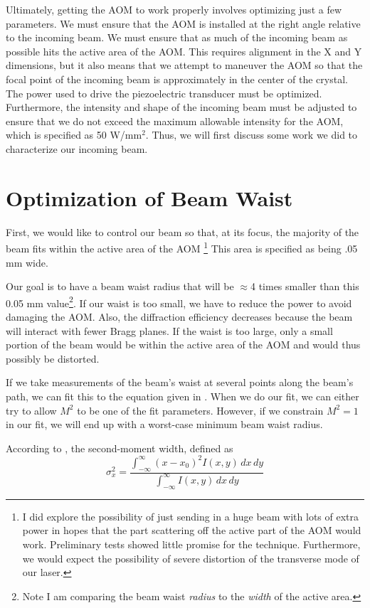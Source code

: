 Ultimately, getting the AOM to work properly involves optimizing just a few parameters. We must ensure that the AOM is installed at the right angle relative to the incoming beam. We must ensure that as much of the incoming beam as possible hits the active area of the AOM. This requires alignment in the X and Y dimensions, but it also means that we attempt to maneuver the AOM so that the focal point of the incoming beam is approximately in the center of the crystal. The power used to drive the piezoelectric transducer must be optimized. Furthermore, the intensity and shape of the incoming beam must be adjusted to ensure that we do not exceed the maximum allowable intensity for the AOM, which is specified as 50 W/mm$^2$.
Thus, we will first discuss some work we did to characterize our incoming beam.

\section{Optimization of Beam Waist}
First, we would like to control our beam so that, at its focus, the majority of the beam fits within the active area of the AOM \footnote{I did explore the possibility of just sending in a huge beam with lots of extra power in hopes that the part scattering off the active part of the AOM would work. Preliminary tests showed little promise for the technique. Furthermore, we would expect the possibility of severe distortion of the transverse mode of our laser.} This area is specified as being .05 mm wide. 

Our goal is to have a beam waist radius that will be $\approx$4 times smaller than this 0.05 mm value\footnote{Note I am comparing the beam waist \emph{radius} to the \emph{width} of the active area.}. If our waist is too small, we have to reduce the power to avoid damaging the AOM. Also, the diffraction efficiency decreases because the beam will interact with fewer Bragg planes. If the waist is too large, only a small portion of the beam would be within the active area of the AOM and would thus possibly be distorted. 

If we take measurements of the beam's waist at several points along the beam's path, we can fit this to the equation given in \cite{SiegmanBeamQuality}. When we do our fit, we can either try to allow $M^2$ to be one of the fit parameters. However, if we constrain $M^2=1$ in our fit, we will end up with a worst-case minimum beam waist radius. 

According to \cite{SiegmanBeamQuality}, the second-moment width, defined as 
\begin{equation}
\sigma_x^2=\frac{\int_{-\infty}^{\infty} (x-x_0)^2 I(x,y)\, dx\, dy}{\int_{-\infty}^{\infty} I(x,y)\, dx \, dy}
\end{equation} 

